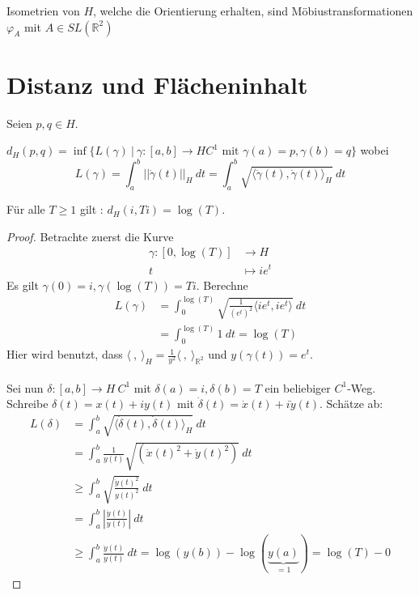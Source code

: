 \documentclass[../main.tex]{subfiles}
\begin{document}
\begin{consequence}
    Isometrien von $H$, welche die Orientierung erhalten, sind Möbiustransformationen $\varphi _A$ mit $A \in SL(\mathbb{R}^2)$
\end{consequence}

\section{Distanz und Flächeninhalt}
Seien $p, q \in H$.
\begin{definition}
    $d_H (p,q) = \inf \{L(\gamma) \ | \ \gamma : [a,b] \to H C^1 \text{ mit } \gamma (a)=p, \gamma(b)=q \}$
    wobei
    $$L(\gamma) = \int_a^b || \dot{\gamma}(t)||_H \ dt = \int _a^b \sqrt{\langle \dot{\gamma}(t), \dot{\gamma}(t) \rangle _H} \ dt$$
\end{definition}

\begin{lemma}
    Für alle $T \ge 1$ gilt : $d _H (i, Ti) = \log (T)$.
\end{lemma}
\begin{proof}
    Betrachte zuerst die Kurve
    \begin{align*}
        \gamma : [0, \log(T)] & \to H \\
        t & \mapsto ie^t
    \end{align*}
    Es gilt $\gamma(0) = i, \gamma(\log(T))= Ti$. Berechne
    \begin{align*}
        L (\gamma) &= \int _0 ^{\log (T)} \sqrt{\frac{1}{(e^t)^2}\langle ie^t, ie^t \rangle} \ dt \\
        &= \int _0 ^{\log (T)} 1 \ dt = \log (T)
    \end{align*}
    Hier wird benutzt, dass $\langle \ , \ \rangle _H = \frac{1}{y^2} \langle \ , \ \rangle _ {\mathbb{R}^2}$ und $y(\gamma (t))= e^t$.
    \\ \\
    Sei nun $\delta :[a,b] \to H \ C^1$ mit $\delta (a) =i, \delta (b)=T$ ein beliebiger $C^1$-Weg.
    Schreibe $\delta (t) = x(t)+ iy(t)$ mit $\dot{\delta}(t)=\dot{x}(t)+i\dot{y}(t)$.
    Schätze ab:
    \begin{align*}
        L (\delta) &= \int _a ^b \sqrt{\langle \dot{\delta}(t), \dot{\delta}(t) \rangle _H} \ dt \\
        &= \int _a ^b \frac{1}{y(t)} \sqrt{(\dot{x}(t)^2+\dot{y}(t)^2)} \ dt \\
        & \ge \int _a ^b \sqrt{\frac{\dot{y}(t)^2}{y(t)^2}} \ dt \\
        &= \int _a ^b \left | \frac{\dot{y}(t)}{y(t)} \right | \ dt \\
        &\ge \int _a ^b \frac{\dot{y}(t)}{y(t)} \ dt = \log (y(b)) - \log(\underbrace{y(a)}_{=1})= \log(T) - 0
    \end{align*}
    
\end{proof}
\end{document}
